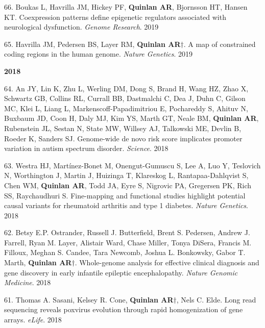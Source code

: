 \documentclass[margin,line]{cv}
\begin{document}
\begin{resume}
\begin{list}{*}{}
    \item[66.] Boukas L, Havrilla JM, Hickey PF, \textbf{Quinlan AR}, Bjornsson HT, Hansen KT. Coexpression patterns define epigenetic regulators associated with neurological dysfunction. \emph{Genome Research}. 2019

    \item[65.] Havrilla JM, Pedersen BS, Layer RM, \textbf{   Quinlan AR}$\dagger$. A map of constrained coding regions in the human genome. \emph{Nature Genetics}. 2019
  
    \end{list}


    \textbf{2018} \\

    \begin{list}{*}{}


    \item[64.] An JY, Lin K, Zhu L, Werling DM, Dong S, Brand H, Wang HZ, Zhao X, Schwartz GB, Collins RL, Currall BB, Dastmalchi C, Dea J, Duhn C, Gilson MC, Klei L, Liang L, Markenscoff-Papadimitriou E, Pochareddy S, Ahituv N, Buxbaum JD, Coon H, Daly MJ, Kim YS, Marth GT, Neale BM, \textbf{Quinlan AR}, Rubenstein JL, Sestan N, State MW, Willsey AJ, Talkowski ME, Devlin B, Roeder K, Sanders SJ. Genome-wide de novo risk score implicates promoter variation in autism spectrum disorder. \emph{Science}. 2018

    \item[63.] Westra HJ, Martínez-Bonet M, Onengut-Gumuscu S, Lee A, Luo Y, Teslovich N, Worthington J, Martin J, Huizinga T, Klareskog L, Rantapaa-Dahlqvist S, Chen WM, \textbf{Quinlan AR}, Todd JA, Eyre S, Nigrovic PA, Gregersen PK, Rich SS, Raychaudhuri S. Fine-mapping and functional studies highlight potential causal variants for rheumatoid arthritis and type 1 diabetes. \emph{Nature Genetics}. 2018

    \item[62.] Betsy E.P. Ostrander, Russell J. Butterfield, Brent S. Pedersen, Andrew J. Farrell, Ryan M. Layer, Alistair Ward, Chase Miller, Tonya DiSera, Francis M. Filloux, Meghan S. Candee, Tara Newcomb, Joshua L. Bonkowsky, Gabor T. Marth, \textbf{Quinlan AR}$\dagger$. Whole-genome analysis for effective clinical diagnosis and gene discovery in early infantile epileptic encephalopathy. \emph{Nature Genomic Medicine}. 2018

    \item[61.] Thomas A. Sasani, Kelsey R. Cone, \textbf{Quinlan AR}$\dagger$, Nels C. Elde. Long read sequencing reveals poxvirus evolution through rapid homogenization of gene arrays. \emph{eLife}. 2018


\end{list}
\end{resume}
\end{document}
